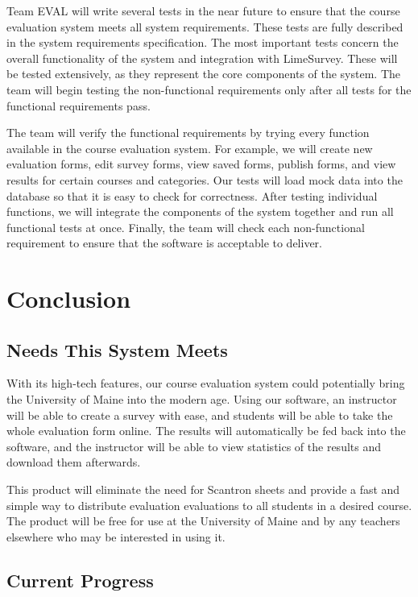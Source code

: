 \documentclass{article}
\begin{document}
Team EVAL will write several tests in the near future to ensure that the course evaluation system meets all system requirements. These tests are fully described in the system requirements specification. The most important tests concern the overall functionality of the system and integration with LimeSurvey. These will be tested extensively, as they represent the core components of the system. The team will begin testing the non-functional requirements only after all tests for the functional requirements pass.

The team will verify the functional requirements by trying every function available in the course evaluation system. For example, we will create new evaluation forms, edit survey forms, view saved forms, publish forms, and view results for certain courses and categories. Our tests will load mock data into the database so that it is easy to check for correctness. After testing individual functions, we will integrate the components of the system together and run all functional tests at once. Finally, the team will check each non-functional requirement to ensure that the software is acceptable to deliver.

\newpage

\section{Conclusion}

\subsection{Needs This System Meets}

With its high-tech features, our course evaluation system could potentially bring the University of Maine into the modern age. Using our software, an instructor will be able to create a survey with ease, and students will be able to take the whole evaluation form online. The results will automatically be fed back into the software, and the instructor will be able to view statistics of the results and download them afterwards.

This product will eliminate the need for Scantron sheets and provide a fast and simple way to distribute evaluation evaluations to all students in a desired course. The product will be free for use at the University of Maine and by any teachers elsewhere who may be interested in using it.

\subsection{Current Progress}
\end{document}
